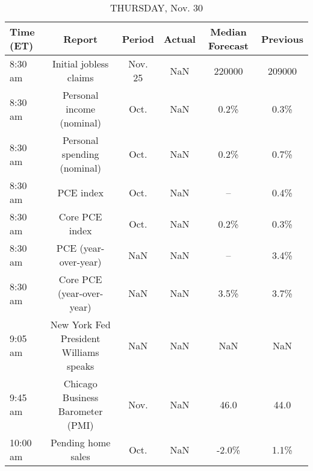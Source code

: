 \documentclass{article}%
\begin{document}
\begin{table}[htbp]%
\caption{THURSDAY, Nov. 30}%
\centering%
\begin{adjustbox}{width=1\textwidth}%
\begin{tabular}{lccccc}
\toprule
Time (ET) &                                 Report &  Period & Actual & Median Forecast & Previous \\
\midrule
  8:30 am &                 Initial jobless claims & Nov. 25 &    NaN &          220000 &   209000 \\
  8:30 am &              Personal income (nominal) &    Oct. &    NaN &            0.2\% &     0.3\% \\
  8:30 am &            Personal spending (nominal) &    Oct. &    NaN &            0.2\% &     0.7\% \\
  8:30 am &                              PCE index &    Oct. &    NaN &              -- &     0.4\% \\
  8:30 am &                         Core PCE index &    Oct. &    NaN &            0.2\% &     0.3\% \\
  8:30 am &                   PCE (year-over-year) &     NaN &    NaN &              -- &     3.4\% \\
  8:30 am &              Core PCE (year-over-year) &     NaN &    NaN &            3.5\% &     3.7\% \\
  9:05 am & New York Fed President Williams speaks &     NaN &    NaN &             NaN &      NaN \\
  9:45 am &       Chicago Business Barometer (PMI) &    Nov. &    NaN &            46.0 &     44.0 \\
 10:00 am &                     Pending home sales &    Oct. &    NaN &           -2.0\% &     1.1\% \\
\bottomrule
\end{tabular}
%
\end{adjustbox}%
\end{table}

%
\end{document}

